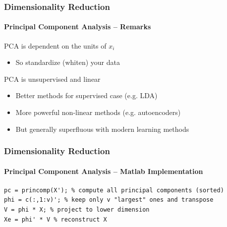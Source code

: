\documentclass[xetex,professionalfont]{beamer}
\newcommand{\eg}{\mbox{e.g.}\xspace} %
\begin{document}

\begin{frame}
\frametitle{Dimensionality Reduction}
\framesubtitle{Principal Component Analysis -- Remarks}

PCA is dependent on the units of $x_i$
\begin{itemize}
	\item So standardize (whiten) your data %
\end{itemize}

\bigskip
PCA is unsupervised and linear
\begin{itemize}
	\item Better methods for supervised case (\eg LDA) %
	\item More powerful non-linear methods (\eg autoencoders)
	\item But generally superfluous with modern learning methods %
\end{itemize}

\end{frame}


\begin{frame}[fragile]
\frametitle{Dimensionality Reduction}
\framesubtitle{Principal Component Analysis -- Matlab Implementation}


\begin{verbatim}
pc = princomp(X'); % compute all principal components (sorted)
phi = c(:,1:v)'; % keep only v "largest" ones and transpose
V = phi * X; % project to lower dimension
Xe = phi' * V % reconstruct X
\end{verbatim}

\end{frame}

\end{document}
